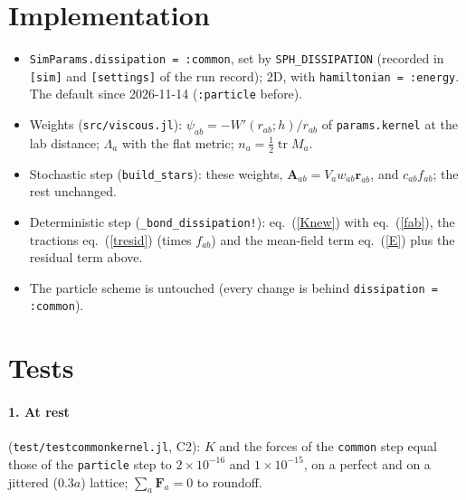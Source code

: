\documentclass[11pt,aps,preprint,nofootinbib,superscriptaddress,tightenlines]{revtex4-2}
\def\Eq#1{eq.~(\ref{#1})}
\def\tr{\operatorname{tr}}
\let\oldparagraph\paragraph
\renewcommand{\paragraph}{\par\bigskip\oldparagraph}
\begin{document}
\section{Implementation}
\label{sec:impl}

\begin{itemize}
\item \texttt{SimParams.dissipation = :common}, set by \texttt{SPH\_DISSIPATION} (recorded in \texttt{[sim]} and
  \texttt{[settings]} of the run record); 2D, with \texttt{hamiltonian = :energy}.  The default since 2026-11-14 (\texttt{:particle} before).
\item Weights (\texttt{src/viscous.jl}): $\psi_{ab}=-W'(r_{ab};h)/r_{ab}$ of \texttt{params.kernel} at the lab distance; $\Lambda_a$ with the flat
  metric; $n_a=\frac12\tr M_a$.
\item Stochastic step (\texttt{build\_stars}): these weights, $\bm A_{ab}=V_aw_{ab}\bm r_{ab}$, and $c_{ab}f_{ab}$; the rest unchanged.
\item Deterministic step (\texttt{\_bond\_dissipation!}): \Eq{Knew} with \Eq{fab}, the tractions \Eq{tresid} (times $f_{ab}$) and the
  mean-field term \Eq{E} plus the residual term above.
\item The particle scheme is untouched (every change is behind \texttt{dissipation = :common}).
\end{itemize}

\section{Tests}
\label{sec:tests}

\paragraph{1. At rest} (\texttt{test/testcommonkernel.jl}, C2): $K$ and the forces of the \texttt{common} step equal those of the
\texttt{particle} step to $2\times10^{-16}$ and $1\times10^{-15}$, on a perfect and on a jittered ($0.3a$) lattice; $\sum_a\bm F_a=0$ to roundoff.
\end{document}
